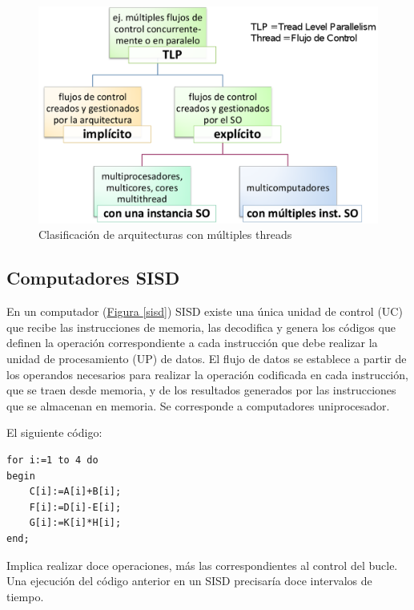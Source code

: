 \documentclass[10pt,a4paper,spanish]{report}
\begin{document}
\begin{figure}
\centering
\includegraphics[width=1\textwidth]{22}
\caption{Clasificación de arquitecturas con múltiples threads}
\label{clasificacion_threads}
\end{figure}

\textcolor[rgb]{0.2,0.4,0.8}{\subsection{Computadores SISD}}
En un computador (\hyperref[sisd]{Figura \ref*{sisd}}) SISD existe una única unidad de control (UC) que recibe las instrucciones de memoria, las decodifica y genera los códigos que definen la operación correspondiente a cada instrucción que debe realizar la unidad de procesamiento (UP) de datos. El flujo de datos se establece a partir de los operandos necesarios para realizar la operación codificada en cada instrucción, que se traen desde memoria, y de los resultados generados por las instrucciones que se almacenan en memoria. Se corresponde a computadores uniprocesador. 

El siguiente código:

\begin{verbatim}
for i:=1 to 4 do
begin
    C[i]:=A[i]+B[i];
    F[i]:=D[i]-E[i];
    G[i]:=K[i]*H[i];
end;
\end{verbatim}

Implica realizar doce operaciones, más las correspondientes al control del bucle. Una ejecución del código anterior en un SISD precisaría doce intervalos de tiempo.
\end{document}
